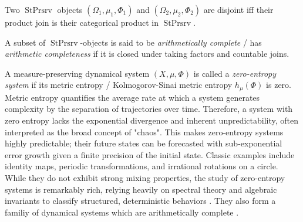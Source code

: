 \documentclass[12pt,oneside,pb-diagram]{article}
\DeclareMathOperator{\sps}{StPrsrv}
\begin{document}

\begin{lemma}  \label{lem:disjoint_lim}
	Two $\sps$ objects $(\Omega_1, \mu_1, \Phi_1)$ and $(\Omega_2, \mu_2, \Phi_2)$ are disjoint iff their product join is their categorical product in $\sps$.
\end{lemma}

\begin{definition} 
	A subset of $\sps$-objects is said to be \textit{arithmetically complete} / has \textit{arithmetic completeness} if it is closed under taking factors and countable joins.
\end{definition}

\begin{Erg}{}{} 
	A measure-preserving dynamical system $(X, \mu, \Phi)$ is called a \textit{zero-entropy system} if its metric entropy / Kolmogorov-Sinai metric entropy $h_\mu(\Phi)$ is zero. Metric entropy quantifies the average rate at which a system generates complexity by the separation of trajectories over time. Therefore, a system with zero entropy lacks the exponential divergence and inherent unpredictability, often interpreted as the broad concept of "chaos". This makes zero-entropy systems highly predictable; their future states can be forecasted with sub-exponential error growth given a finite precision of the initial state. Classic examples include identity maps, periodic transformations, and irrational rotations on a circle. While they do not exhibit strong mixing properties, the study of zero-entropy systems is remarkably rich, relying heavily on spectral theory and algebraic invariants to classify structured, deterministic behaviors \cite[e.g.]{dooley2005approx}. They also form a familiy of dynamical systems which are  arithmetically complete \cite[e.g.]{glasner1995quasi, blanchard1993zero}. 
\end{Erg}
\end{document}
